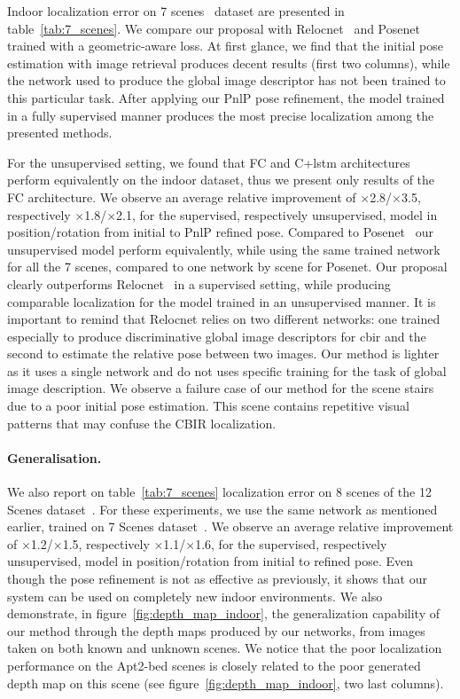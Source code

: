 

Indoor localization error on 7 scenes~\citep{Shotton2013} dataset are presented in table~\ref{tab:7_scenes}. We compare our proposal with Relocnet~\citep{Purkait2018} and Posenet~\citep{Kendall2017} trained with a geometric-aware loss. At first glance, we find that the initial pose estimation with image retrieval produces decent results (first two columns), while the network used to produce the global image descriptor has not been trained to this particular task. After applying our PnlP pose refinement, the model trained in a fully supervised manner produces the most precise localization among the presented methods. 

For the unsupervised setting, we found that FC and C+\ac{lstm} architectures perform equivalently on the indoor dataset, thus we present only results of the FC architecture. We observe an average relative improvement of $\times$2.8/$\times$3.5, respectively $\times$1.8/$\times$2.1, for the supervised, respectively unsupervised, model in position/rotation from initial to PnlP refined pose. Compared to Posenet~\citep{Kendall2017} our unsupervised model perform equivalently, while using the same trained network for all the 7 scenes, compared to one network by scene for Posenet. Our proposal clearly outperforms Relocnet~\citep{Balntas2018} in a supervised setting, while producing comparable localization for the model trained in an unsupervised manner. It is important to remind that Relocnet relies on two different networks: one trained especially to produce discriminative global image descriptors for \ac{cbir} and the second to estimate the relative pose between two images. Our method is lighter as it uses a single network and do not uses specific training for the task of global image description. We observe a failure case of our method for the scene stairs due to a poor initial pose estimation. This scene contains repetitive visual patterns that may confuse the CBIR localization.

\paragraph{Generalisation.} We also report on table~\ref{tab:7_scenes} localization error on 8 scenes of the 12 Scenes dataset~\citep{Valentin2016}. For these experiments, we use the same network as mentioned earlier, trained on 7 Scenes dataset~\citep{Shotton2013}. We observe an average relative improvement of $\times$1.2/$\times$1.5, respectively $\times$1.1/$\times$1.6, for the supervised, respectively unsupervised, model in position/rotation from initial to refined pose. Even though the pose refinement is not as effective as previously, it shows that our system can be used on completely new indoor environments. We also demonstrate, in figure~\ref{fig:depth_map_indoor}, the generalization capability of our method through the depth maps produced by our networks, from images taken on both known and unknown scenes. We notice that the poor localization performance on the Apt2-bed scenes is closely related to the poor generated depth map on this scene (see figure~\ref{fig:depth_map_indoor}, two last columns).

